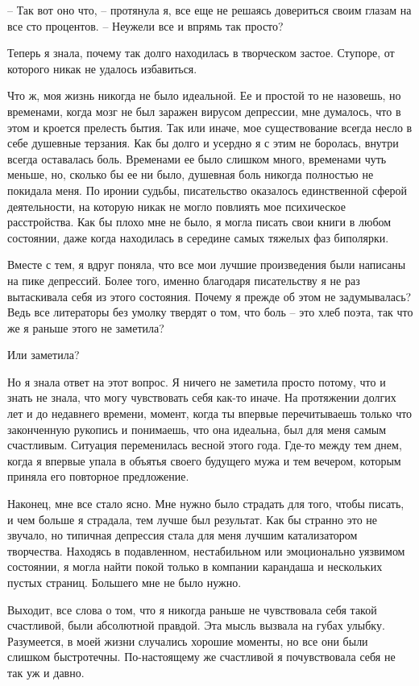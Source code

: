 \documentclass[
]{book}
\begin{document}
-- Так вот оно что, -- протянула я, все еще не решаясь довериться своим глазам на все сто процентов. -- Неужели все и впрямь так просто?

Теперь я знала, почему так долго находилась в творческом застое. Ступоре, от которого никак не удалось избавиться.

Что ж, моя жизнь никогда не было идеальной. Ее и простой то не назовешь, но временами, когда мозг не был заражен вирусом депрессии, мне думалось, что в этом и кроется прелесть бытия. Так или иначе, мое существование всегда несло в себе душевные терзания. Как бы долго и усердно я с этим не боролась, внутри всегда оставалась боль. Временами ее было слишком много, временами чуть меньше, но, сколько бы ее ни было, душевная боль никогда полностью не покидала меня. По иронии судьбы, писательство оказалось единственной сферой деятельности, на которую никак не могло повлиять мое психическое расстройства. Как бы плохо мне не было, я могла писать свои книги в любом состоянии, даже когда находилась в середине самых тяжелых фаз биполярки.

Вместе с тем, я вдруг поняла, что все мои лучшие произведения были написаны на пике депрессий. Более того, именно благодаря писательству я не раз вытаскивала себя из этого состояния. Почему я прежде об этом не задумывалась? Ведь все литераторы без умолку твердят о том, что боль -- это хлеб поэта, так что же я раньше этого не заметила?

Или заметила?

Но я знала ответ на этот вопрос. Я ничего не заметила просто потому, что и знать не знала, что могу чувствовать себя как-то иначе. На протяжении долгих лет и до недавнего времени, момент, когда ты впервые перечитываешь только что законченную рукопись и понимаешь, что она идеальна, был для меня самым счастливым. Ситуация переменилась весной этого года. Где-то между тем днем, когда я впервые упала в объятья своего будущего мужа и тем вечером, которым приняла его повторное предложение.

Наконец, мне все стало ясно. Мне нужно было страдать для того, чтобы писать, и чем больше я страдала, тем лучше был результат. Как бы странно это не звучало, но типичная депрессия стала для меня лучшим катализатором творчества. Находясь в подавленном, нестабильном или эмоционально уязвимом состоянии, я могла найти покой только в компании карандаша и нескольких пустых страниц. Большего мне не было нужно.

Выходит, все слова о том, что я никогда раньше не чувствовала себя такой счастливой, были абсолютной правдой. Эта мысль вызвала на губах улыбку. Разумеется, в моей жизни случались хорошие моменты, но все они были слишком быстротечны. По-настоящему же счастливой я почувствовала себя не так уж и давно.
\end{document}
